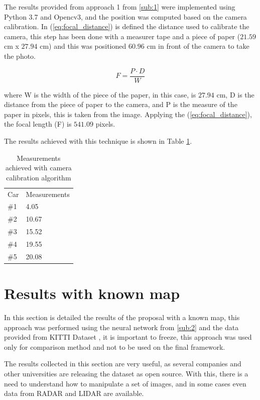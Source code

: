 The results provided from approach 1 from \ref{sub:1} were implemented using Python 3.7 and Opencv3, and the position was computed based on the camera calibration. In (\ref{eq:focal_distance}) is defined the distance used to calibrate the camera, this step has been done with a measurer tape and a piece of paper ($21.59$ cm x  $27.94$ cm) and this was positioned $60.96$ cm in front of the camera to take the photo.

\begin{equation}
    \label{eq:focal_distance}
    F = \frac{P\cdot D}{W}
\end{equation}

where W is the width of the piece of the paper, in this case, is $27.94$ cm, D is the distance from the piece of paper to the camera, and P is the measure of the paper in pixels, this is taken from the image. Applying the (\ref{eq:focal_distance}), the focal length (F) is $541.09$ pixels.





The results achieved with this technique is shown in Table \ref{tab:output_calibrate}. 

\begin{table}[H]
\centering
\caption{Measurements achieved with camera calibration algorithm}
\begin{tabular}{l|l} 
\toprule
Car &  Measurements      \\
\#1   & 4.05        \\
\#2   & 10.67       \\
\#3   & 15.52       \\
\#4   & 19.55       \\
\#5   & 20.08       \\
\bottomrule
\end{tabular}
\label{tab:output_calibrate}
\end{table} 



\section{Results with known map}
In this section is detailed the results of the proposal with a known map, this approach was performed using the neural network from \ref{sub:2} and the data provided from KITTI Dataset \cite{geiger2013vision}, it is important to freeze, this approach was used only for comparison method and not to be used on the final framework. 


The results collected in this section are very useful, as several companies and other universities are releasing the dataset as open source. With this, there is a need to understand how to manipulate a set of images, and in some cases even data from RADAR and LIDAR are available.

